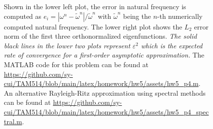 \begin{enumerate}[(i)]
\begin{figure}[!ht]
{        Shown in the lower left plot, the error in natural frequency is computed as $e_i = |\omega^n - \tilde{\omega}^n| / \tilde{\omega}^n$ with $\tilde{\omega}^n$ being the $n$-th numerically computed natural frequency. 
        The lower right plot shows the $L_2$ error norm of the first three orthonormalized eigenfunctions. 
        \emph{The solid black lines in the lower two plots represent $\varepsilon^2$ which is the expected rate of convergence for a first-order asymptotic approximation.} 
        The MATLAB code for this problem can be found at \url{https://github.com/sy-cui/TAM514/blob/main/latex/homework/hw5/assets/hw5_p4.m}.
        An alternative Rayleigh-Ritz approximation using spectral methods can be found at \url{https://github.com/sy-cui/TAM514/blob/main/latex/homework/hw5/assets/hw5_p4_spectral.m}.
    }\label{fig:hw5_p4_conv}
\end{figure}

\end{enumerate}

